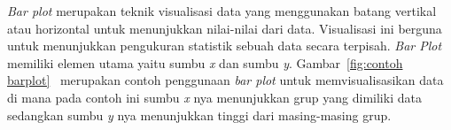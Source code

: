 \textit{Bar plot} merupakan teknik visualisasi data yang menggunakan batang vertikal atau horizontal untuk menunjukkan nilai-nilai dari data. Visualisasi ini berguna untuk menunjukkan pengukuran statistik sebuah data secara terpisah. \textit{Bar Plot} memiliki elemen utama yaitu sumbu \textit{x} dan sumbu \textit{y}. Gambar~\ref{fig:contoh barplot}~\cite{Phillips} merupakan contoh penggunaan \textit{bar plot} untuk memvisualisasikan data di mana pada contoh ini sumbu \textit{x} nya menunjukkan grup yang dimiliki data sedangkan sumbu \textit{y} nya menunjukkan tinggi dari masing-masing grup.